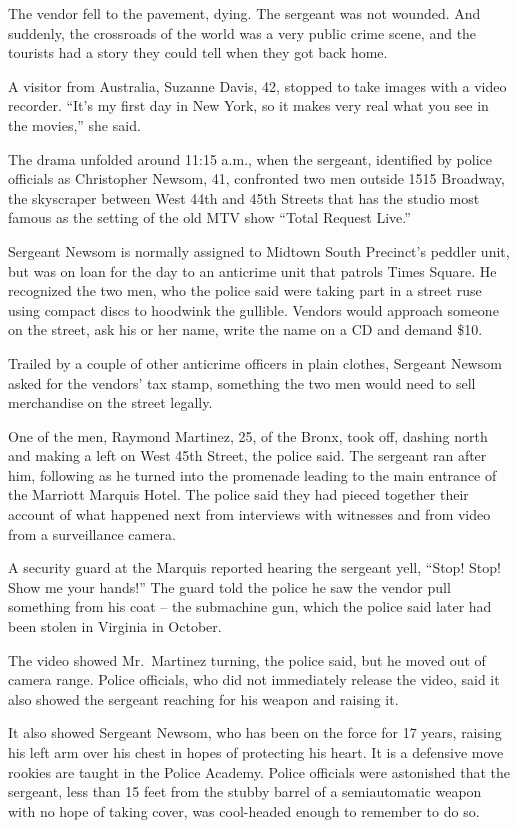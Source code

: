 ﻿\documentclass[12pt]{article}
\begin{document}
The vendor fell to the pavement, dying. The sergeant was not wounded. And suddenly, the crossroads
of the world was a very public crime scene, and the tourists had a story they could tell when they
got back home.

A visitor from Australia, Suzanne Davis, 42, stopped to take images with a video recorder. ``It's my
first day in New York, so it makes very real what you see in the movies,'' she said.

The drama unfolded around 11:15 a.m., when the sergeant, identified by police officials as
Christopher Newsom, 41, confronted two men outside 1515 Broadway, the skyscraper between West 44th
and 45th Streets that has the studio most famous as the setting of the old MTV show ``Total Request
Live.''

Sergeant Newsom is normally assigned to Midtown South Precinct's peddler unit, but was on loan for
the day to an anticrime unit that patrols Times Square. He recognized the two men, who the police
said were taking part in a street ruse using compact discs to hoodwink the gullible. Vendors would
approach someone on the street, ask his or her name, write the name on a CD and demand \$10.

Trailed by a couple of other anticrime officers in plain clothes, Sergeant Newsom asked for the
vendors' tax stamp, something the two men would need to sell merchandise on the street legally.

One of the men, Raymond Martinez, 25, of the Bronx, took off, dashing north and making a left on
West 45th Street, the police said. The sergeant ran after him, following as he turned into the
promenade leading to the main entrance of the Marriott Marquis Hotel. The police said they had
pieced together their account of what happened next from interviews with witnesses and from video
from a surveillance camera.

A security guard at the Marquis reported hearing the sergeant yell, ``Stop! Stop! Show me your
hands!'' The guard told the police he saw the vendor pull something from his coat -- the submachine
gun, which the police said later had been stolen in Virginia in October.

The video showed Mr.~Martinez turning, the police said, but he moved out of camera range. Police
officials, who did not immediately release the video, said it also showed the sergeant reaching for
his weapon and raising it.

It also showed Sergeant Newsom, who has been on the force for 17 years, raising his left arm over
his chest in hopes of protecting his heart. It is a defensive move rookies are taught in the Police
Academy. Police officials were astonished that the sergeant, less than 15 feet from the stubby
barrel of a semiautomatic weapon with no hope of taking cover, was cool-headed enough to remember to
do so.
\end{document}
